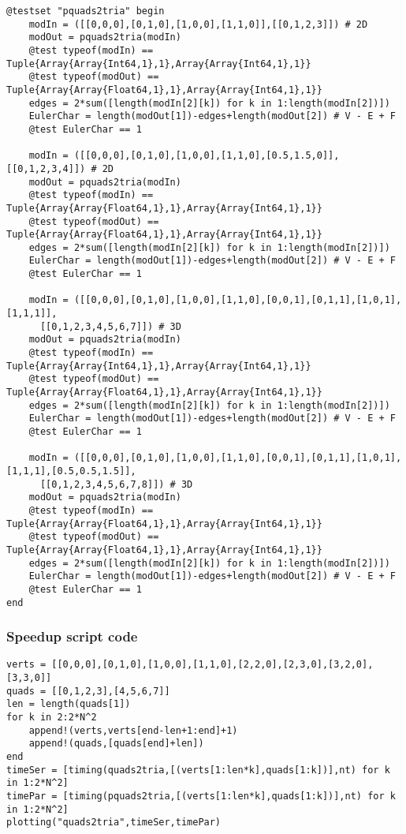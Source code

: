 \documentclass[a4paper,12pt,titlepage]{article}					%
\begin{document}
\begin{Verbatim}
@testset "pquads2tria" begin
	modIn = ([[0,0,0],[0,1,0],[1,0,0],[1,1,0]],[[0,1,2,3]]) # 2D
	modOut = pquads2tria(modIn)
	@test typeof(modIn) == Tuple{Array{Array{Int64,1},1},Array{Array{Int64,1},1}}
	@test typeof(modOut) == Tuple{Array{Array{Float64,1},1},Array{Array{Int64,1},1}}
	edges = 2*sum([length(modIn[2][k]) for k in 1:length(modIn[2])])
	EulerChar = length(modOut[1])-edges+length(modOut[2]) # V - E + F
	@test EulerChar == 1
	
	modIn = ([[0,0,0],[0,1,0],[1,0,0],[1,1,0],[0.5,1.5,0]],[[0,1,2,3,4]]) # 2D
	modOut = pquads2tria(modIn)
	@test typeof(modIn) == Tuple{Array{Array{Float64,1},1},Array{Array{Int64,1},1}}
	@test typeof(modOut) == Tuple{Array{Array{Float64,1},1},Array{Array{Int64,1},1}}
	edges = 2*sum([length(modIn[2][k]) for k in 1:length(modIn[2])])
	EulerChar = length(modOut[1])-edges+length(modOut[2]) # V - E + F
	@test EulerChar == 1
	
	modIn = ([[0,0,0],[0,1,0],[1,0,0],[1,1,0],[0,0,1],[0,1,1],[1,0,1],[1,1,1]],
	  [[0,1,2,3,4,5,6,7]]) # 3D
	modOut = pquads2tria(modIn)
	@test typeof(modIn) == Tuple{Array{Array{Int64,1},1},Array{Array{Int64,1},1}}
	@test typeof(modOut) == Tuple{Array{Array{Float64,1},1},Array{Array{Int64,1},1}}
	edges = 2*sum([length(modIn[2][k]) for k in 1:length(modIn[2])])
	EulerChar = length(modOut[1])-edges+length(modOut[2]) # V - E + F
	@test EulerChar == 1
	
	modIn = ([[0,0,0],[0,1,0],[1,0,0],[1,1,0],[0,0,1],[0,1,1],[1,0,1],[1,1,1],[0.5,0.5,1.5]],
	  [[0,1,2,3,4,5,6,7,8]]) # 3D
	modOut = pquads2tria(modIn)
	@test typeof(modIn) == Tuple{Array{Array{Float64,1},1},Array{Array{Int64,1},1}}
	@test typeof(modOut) == Tuple{Array{Array{Float64,1},1},Array{Array{Int64,1},1}}
	edges = 2*sum([length(modIn[2][k]) for k in 1:length(modIn[2])])
	EulerChar = length(modOut[1])-edges+length(modOut[2]) # V - E + F
	@test EulerChar == 1
end
\end{Verbatim}

\subsubsection{Speedup script code}
\begin{Verbatim}
verts = [[0,0,0],[0,1,0],[1,0,0],[1,1,0],[2,2,0],[2,3,0],[3,2,0],[3,3,0]]
quads = [[0,1,2,3],[4,5,6,7]]
len = length(quads[1])
for k in 2:2*N^2
	append!(verts,verts[end-len+1:end]+1)
	append!(quads,[quads[end]+len])
end
timeSer = [timing(quads2tria,[(verts[1:len*k],quads[1:k])],nt) for k in 1:2*N^2]
timePar = [timing(pquads2tria,[(verts[1:len*k],quads[1:k])],nt) for k in 1:2*N^2]
plotting("quads2tria",timeSer,timePar)
\end{Verbatim}
\end{document}
